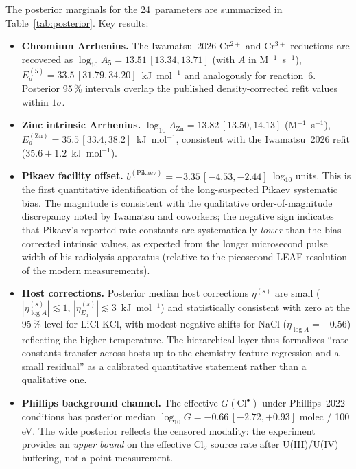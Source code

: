 \documentclass[11pt]{article}
\theoremstyle{plain}
\theoremstyle{definition}
\theoremstyle{remark}
\newcommand{\Ea}{E_a}
\begin{document}
The posterior marginals for the 24~parameters are summarized in
Table~\ref{tab:posterior}.  Key results:

\begin{itemize}
\item \textbf{Chromium Arrhenius.}  The Iwamatsu~2026 Cr$^{2+}$ and Cr$^{3+}$
      reductions are recovered as $\log_{10}\!A_5 = 13.51\,[13.34, 13.71]$
      (with $A$ in M$^{-1}$~s$^{-1}$), $\Ea^{(5)} = 33.5\,[31.79,
      34.20]$~kJ~mol$^{-1}$ and analogously for reaction~6.  Posterior
      95\,\% intervals overlap the published density-corrected refit values
      within $1\sigma$.
\item \textbf{Zinc intrinsic Arrhenius.}  $\log_{10}\!A_{\mathrm{Zn}} =
      13.82\,[13.50, 14.13]$ (M$^{-1}$~s$^{-1}$),
      $\Ea^{(\mathrm{Zn})} = 35.5\,[33.4, 38.2]$~kJ~mol$^{-1}$, consistent
      with the Iwamatsu~2026 refit ($35.6 \pm 1.2$~kJ~mol$^{-1}$).
\item \textbf{Pikaev facility offset.}  $b^{(\mathrm{Pikaev})} =
      -3.35\,[-4.53,-2.44]$~log$_{10}$ units.  This is the first
      quantitative identification of the long-suspected Pikaev systematic
      bias.  The magnitude is consistent with the qualitative
      order-of-magnitude discrepancy noted by Iwamatsu and coworkers; the
      negative sign indicates that Pikaev's reported rate constants are
      systematically \emph{lower} than the bias-corrected intrinsic
      values, as expected from the longer microsecond pulse width of his
      radiolysis apparatus
      (relative to the picosecond LEAF resolution of the modern
      measurements).
\item \textbf{Host corrections.}  Posterior median host corrections
      $\eta^{(s)}$ are small ($|\eta^{(s)}_{\log A}| \lesssim 1$,
      $|\eta^{(s)}_{\Ea}| \lesssim 3$~kJ~mol$^{-1}$) and statistically
      consistent with zero at the 95\,\% level for LiCl-KCl, with modest
      negative shifts for NaCl ($\eta_{\log A} = -0.56$) reflecting the
      higher temperature.  The hierarchical layer thus formalizes ``rate
      constants transfer across hosts up to the chemistry-feature regression
      and a small residual'' as a calibrated quantitative statement rather
      than a qualitative one.
\item \textbf{Phillips background channel.}  The effective $G(\mathrm{Cl}^{\bullet})$
      under Phillips~2022 conditions has posterior median
      $\log_{10}\!G = -0.66\,[-2.72, +0.93]$ molec / 100 eV.  The wide
      posterior reflects the censored modality: the experiment provides an
      \emph{upper bound} on the effective Cl$_2$ source rate after
      U(III)/U(IV) buffering, not a point measurement.
\end{itemize}
\end{document}
